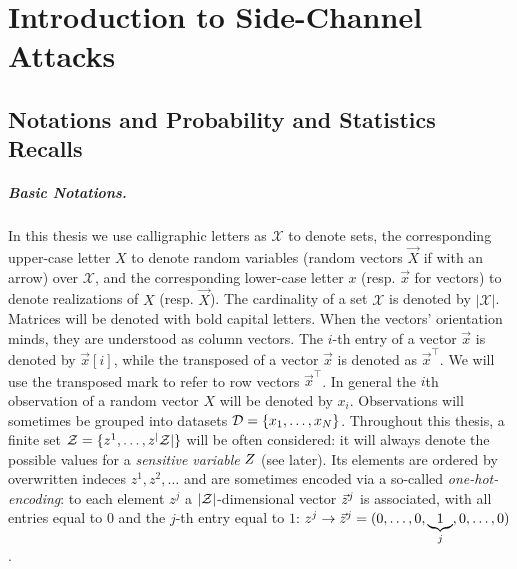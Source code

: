 \chapter{Introduction to Side-Channel Attacks} %

\label{ChapterIntroductionSCA}

\section{Notations and Probability and Statistics Recalls}\label{sec:notations}
\paragraph*{Basic Notations.}
In this thesis we use calligraphic letters as $\mathcal{X}$ to denote
sets, the corresponding upper-case letter $X$ to denote random variables (random
vectors $\vec{X}$ if with an arrow) over $\mathcal{X}$, and the corresponding
lower-case letter $x$ (resp. $\vec{x}$ for vectors) to denote realizations of
$X$ (resp. $\vec{X}$). The cardinality of a set $\mathcal{X}$ is denoted by $\lvert\mathcal{X}\rvert$. Matrices will be denoted with bold capital letters. When the vectors' orientation minds, they are understood as column vectors. The
$i$-th entry of a vector $\vec{x}$ is denoted by $\vec{x}[i]$, while the transposed of a vector $\vec{x}$ is denoted as $\vec{x}^\intercal$. We will use the transposed mark to refer to row vectors $\vec{x}^\intercal$. In general the $i$th observation of a random vector $X$ will be denoted by $x_i$. Observations will sometimes be grouped into datasets $\mathcal{D}=\{x_1,\dots, x_N\}$. Throughout this thesis, a finite set $\mathcal{Z} = \{z^1, \dots, z^\lvert\mathcal{Z}\rvert\}$ will be often considered: it will always denote the possible values for a \emph{sensitive variable} $Z$ (see later). Its elements are ordered by overwritten indeces $z^1, z^2,\dots$ and are sometimes encoded via a so-called \emph{one-hot-encoding}: to each element $z^j$ a $\lvert\mathcal{Z}\rvert$-dimensional vector  $\vec{z}^j$ is associated,
with all entries equal to $0$ and the $j$-th entry equal to $1$: $z^j
\rightarrow \vec{z}^j = (0,\ldots , 0,\underbrace{1}_{j},0,\dots,0)$.

